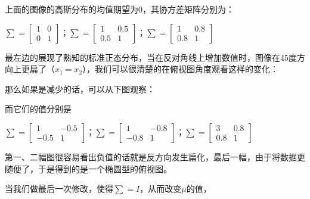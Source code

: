 \documentclass[UTF8]{ctexart}
\begin{document}
上面的图像的高斯分布的均值期望为0，其协方差矩阵分别为：
\begin{center}
$\sum = \begin{bmatrix} 1 & 0 \\ 0 & 1 \end{bmatrix}  ； \sum = \begin{bmatrix} 1 & 0.5 \\ 0.5 & 1 \end{bmatrix} ；\sum = \begin{bmatrix} 1 & 0.8 \\ 0.8 & 1 \end{bmatrix}$
\end{center}

最左边的展现了熟知的标准正态分布，当在反对角线上增加数值时，图像在45度方向上更扁了（$x_{1}=x_{2}$），我们可以很清楚的在俯视图角度观看这样的变化：

\begin{figure}[htb]        
\end{figure}



那么如果是减少的话，可以从下图观察：


\begin{figure}[htb]        
\end{figure}


而它们的值分别是\\
\begin{center}
$\sum = \begin{bmatrix} 1 & -0.5 \\ -0.5 & 1 \end{bmatrix}  ； \sum = \begin{bmatrix} 1 & -0.8 \\ -0.8 & 1 \end{bmatrix} ； \sum = \begin{bmatrix} 3 & 0.8 \\ 0.8 & 1 \end{bmatrix}$
\end{center}

第一、二幅图很容易看出负值的话就是反方向发生扁化，最后一幅，由于将数据更随便了，于是得到的是一个椭圆型的俯视图。


当我们做最后一次修改，使得$\sum=I$，从而改变$\mu$的值，


\begin{figure}[htb]        
\end{figure}
\end{document}
